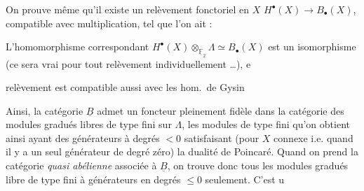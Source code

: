 \documentclass[11pt,a4paper]{article}
\begin{document}
On prouve même qu'il existe un relèvement fonctoriel en $X$
$H^{\bullet}(X) \to B_{\bullet}(X)$, 
compatible avec multiplication, tel que l'on ait :

 L'homomorphisme correspondant
$H^{\bullet}(X) \otimes_{\underline{\mathbb{F}}_{2}} \Lambda \simeq
B_{\bullet}(X)$ est un isomorphisme (ce sera vrai pour tout relèvement
individuellement …), e

 \add{[Quillen ignore si}  relèvement est compatible
aussi avec les hom.\ de Gysin

Ainsi, la catégorie $\underline{B}$ admet un foncteur pleinement fidèle dans la
catégorie des modules gradués libres de type fini sur $\Lambda$, les modules de
type fini qu'on obtient ainsi ayant des générateurs à degrés $< 0$ satisfaisant
(pour $X$ connexe i.e. quand il y a un seul générateur de degré zéro) la
dualité de Poincaré. Quand on prend la catégorie \emph{quasi abélienne}
 associée à $\underline{B}$, on trouve donc
tous les modules gradués libre de type fini à générateurs en degrés
$\leq 0$ seulement. C'est u
\end{document}

